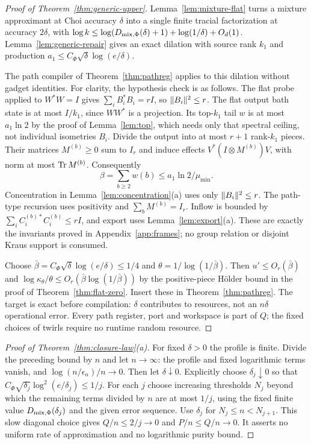 \begin{proof}[Proof of Theorem~\ref{thm:generic-upper}]
Lemma~\ref{lem:mixture-flat} turns a mixture approximant at Choi accuracy $\delta$ into a single finite tracial factorization at accuracy
$2\delta$, with $\log k\le\log(D_{\rm mix,\Phi}(\delta)+1)+\log(1/\delta)+O_d(1)$.
Lemma~\ref{lem:generic-repair} gives an exact dilation with source rank $k_1$ and production
$a_1\le C_\Phi\sqrt\delta\log(e/\delta)$.

The path compiler of Theorem~\ref{thm:pathreg} applies to this dilation without gadget identities.
For clarity, the hypothesis check is as follows. The flat probe applied to $W^*W=I$ gives
$\sum_iB_i^*B_i=rI$, so $\lVert B_i\rVert^2\le r$. The flat output bath state is at most $I/k_1$, since $WW^*$ is a projection.
Its top-$k_1$ tail $w$ is at most $a_1\ln2$ by the proof of Lemma~\ref{lem:top}, which needs only that spectral ceiling,
not individual isometries $B_i$. Divide the output into at most $r+1$ rank-$k_1$ pieces.
Their matrices $M^{(b)}\ge0$ sum to $I_r$ and induce effects
$V^*(I\otimes M^{(b)})V$, with norm at most $\operatorname{Tr} M^{(b)}$.
Consequently
\[
 \beta=\sum_{b\ge2}w(b)\le a_1\ln2/\mu_{\min}.
\]
Concentration in Lemma~\ref{lem:concentration}(a) uses only $\lVert B_i\rVert^2\le r$.
The path-type recursion uses positivity and $\sum_bM^{(b)}=I_r$.
Inflow is bounded by $\sum_i C_i^{(b)*}C_i^{(b)}\le rI$, and export uses Lemma~\ref{lem:export}(a).
These are exactly the invariants proved in Appendix~\ref{app:frames}; no group relation or disjoint Kraus support is consumed.

Choose $\bar\beta=C_\Phi\sqrt\delta\log(e/\delta)\le1/4$ and
$\theta=1/\log(1/\bar\beta)$. Then
$u'\le O_r(\bar\beta)$ and
$\log\kappa_\theta/\theta\le O_r(\bar\beta\log(1/\bar\beta))$ by the positive-piece H\"older bound in the proof of
Theorem~\ref{thm:flat-zero}. Insert these in Theorem~\ref{thm:pathreg}.
The target is exact before compilation: $\delta$ contributes to resources, not an $n\delta$ operational error.
Every path register, port and workspace is part of $Q$; the fixed choices of twirls require no runtime random resource.
\end{proof}

\begin{proof}[Proof of Theorem~\ref{thm:closure-law}(a)]
For fixed $\delta>0$ the profile is finite. Divide the preceding bound by $n$ and let $n\to\infty$:
the profile and fixed logarithmic terms vanish, and $\log(n/\epsilon_n)/n\to0$.
Then let $\delta\downarrow0$. Explicitly choose $\delta_j\downarrow0$ so that
$C_\Phi\sqrt{\delta_j}\log^2(e/\delta_j)\le1/j$.
For each $j$ choose increasing thresholds $N_j$ beyond which the remaining terms divided by $n$ are at most $1/j$,
using the fixed finite value $D_{\rm mix,\Phi}(\delta_j)$ and the given error sequence.
Use $\delta_j$ for $N_j\le n<N_{j+1}$. This slow diagonal choice gives $Q/n\le2/j\to0$ and $P/n\le Q/n\to0$.
It asserts no uniform rate of approximation and no logarithmic purity bound.
\end{proof}

